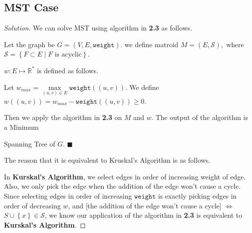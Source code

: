 \documentclass{article}
\renewcommand{\qedsymbol}{\hfill $\blacksquare$\par}
\newcommand{\set}[1]{\left\{#1\right\}}
\newenvironment{solution}{\begin{proof}[\noindent\it Solution]}{\end{proof}}
\begin{document}
\subsection{MST Case}
\vspace{1em}
\begin{solution}
    We can solve MST using algorithm in \textbf{2.3} as follows.
    
    \hspace{2.6em}
    Let the graph be $G=(V,E,\mathtt{weight})$. we define matroid $M=(E,\mathcal{S}),$ where $\mathcal{S}=\set{F\subset E\mid F\text{ is acyclic}}$.
    
    \hspace{2.6em}
    $w:E\mapsto\mathbb{R}^*$ is defined as follows. 
    
    \hspace{2.6em}
    Let $w_{max} = \underset{(u,v)\in E}{\max}\mathtt{weight}\left((u,v)\right)$. We define $w\left((u,v)\right)=w_{max} - \mathtt{weight}\left((u,v)\right)\geq 0$.
    
    \vspace{0.5em} \hspace{2.6em}
    Then we apply the algorithm in \textbf{2.3} on $M$ and $w$. The output of the algorithm is a Minimum
    
    \hspace{0.6em}
    Spanning Tree of $G$. \qedsymbol
    
    \vspace{2em} \hspace{0.6em}
    The reason that it is equivalent to Kruskal's Algorithm is as follows.
    
    \hspace{0.6em}
    In \textbf{Kurskal's Algorithm}, we select edges in order of increasing weight of edge. Also, we only pick the edge when the addition of the edge won't cause a cycle. Since selecting edges in order of increasing $\mathtt{weight}$ is exactly picking edges in order of decreasing $w$, and [the addition of the edge won't cause a cycle] $\Longleftrightarrow$ $S\cup\set{x}\in\mathcal{S}$, we know our application of the algorithm in \textbf{2.3} is equivalent to \textbf{Kurskal's Algorithm}.
\end{solution}

\vspace{1em}
\end{document}
